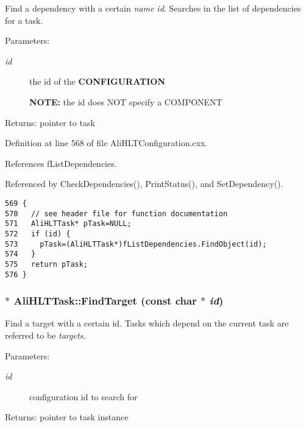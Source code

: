Find a dependency with a certain {\em name id\/}. Searches in the list of dependencies for a task. \begin{Desc}
\item[Parameters:]
\begin{description}
\item[{\em id}]the id of the {\bf CONFIGURATION}\par
 {\bf NOTE:} the id does NOT specify a COMPONENT \end{description}
\end{Desc}
\begin{Desc}
\item[Returns:]pointer to task \end{Desc}


Definition at line 568 of file Ali\-HLTConfiguration.cxx.

References f\-List\-Dependencies.

Referenced by Check\-Dependencies(), Print\-Status(), and Set\-Dependency().

\footnotesize\begin{verbatim}569 {
570   // see header file for function documentation
571   AliHLTTask* pTask=NULL;
572   if (id) {
573     pTask=(AliHLTTask*)fListDependencies.FindObject(id);
574   }
575   return pTask;
576 }
\end{verbatim}\normalsize 


\subsubsection{ $\ast$ Ali\-HLTTask::Find\-Target (const char $\ast$ {\em id})}\label{classAliHLTTask_a15}


Find a target with a certain id. Tasks which depend on the current task are referred to be {\em targets\/}. \begin{Desc}
\item[Parameters:]
\begin{description}
\item[{\em id}]configuration id to search for \end{description}
\end{Desc}
\begin{Desc}
\item[Returns:]pointer to task instance \end{Desc}


